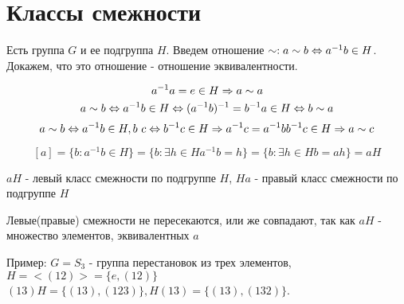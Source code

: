 \section{Классы смежности}

Есть группа $G$ и ее подгруппа $H$. Введем отношение $\sim: a\sim b \Leftrightarrow a^{-1}b \in H$.
Докажем, что это отношение - отношение эквивалентности.

$$a^{-1}a = e \in H \Rightarrow a \sim a$$
$$a \sim b \Leftrightarrow a^{-1}b \in H \Leftrightarrow (a^{-1}b)^{-1} = b^{-1}a \in H \Leftrightarrow b \sim a$$
$$a \sim b \Leftrightarrow a^{-1}b \in H, b ~ c \Leftrightarrow b^{-1}c \in H \Rightarrow a^{-1}c = a^{-1}bb^{-1}c \in H \Rightarrow a \sim c$$

$$[a] = \{b: a^{-1}b \in H\} = \{b: \exists h \in H a^{-1}b = h\} = \{b: \exists h \in H b = ah\} = aH$$

\begin{Def}
	$aH$ - левый класс смежности по подгруппе $H$, $Ha$ - правый класс смежности по подгруппе $H$
\end{Def}
\begin{Rem}
	Левые(правые) смежности не пересекаются, или же совпадают, так как $aH$ - множество элементов, эквивалентных $a$
\end{Rem}

Пример: $G = S_3$ - группа перестановок из трех элементов, $H = <(12)> = \{e, (12)\}$ \\
$(13)H = \{(13), (123)\}, H(13) = \{(13), (132)\}$.                 \\
